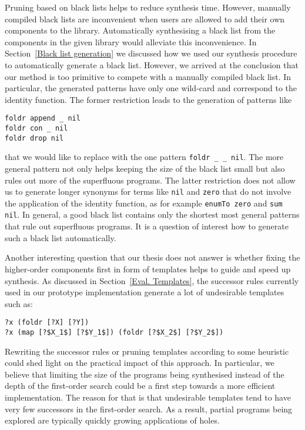Pruning based on black lists helps to reduce synthesis time. However, manually compiled black lists are inconvenient when users are allowed to add their own components to the library. Automatically synthesising a black list from the components in the given library would alleviate this inconvenience. In Section~\ref{Black list generation} we discussed how we used our synthesis procedure to automatically generate a black list. However, we arrived at the conclusion that our method is too primitive to compete with a manually compiled black list. In particular, the generated patterns have only one wild-card and correspond to the identity function. The former restriction leads to the generation of patterns like
\begin{lstlisting}[style=plain]
foldr append _ nil
foldr con _ nil
foldr drop nil
\end{lstlisting}
that we would like to replace with the one pattern \lstinline!foldr _ _ nil!. The more general pattern not only helps keeping the size of the black list small but also rules out more of the superfluous programs.
The latter restriction does not allow us to generate longer synonyms for terms like \lstinline!nil! and \lstinline!zero! that do not involve the application of the identity function, as for example \lstinline!enumTo zero! and \lstinline!sum nil!.
In general, a good black list contains only the shortest most general patterns that rule out superfluous programs. It is a question of interest how to generate such a black list automatically.

Another interesting question that our thesis does not answer is whether fixing the higher-order components first in form of templates helps to guide and speed up synthesis. As discussed in Section~\ref{Eval. Templates}, the successor rules currently used in our prototype implementation generate a lot of undesirable templates such as:
\begin{lstlisting}[style=plain]
?x (foldr [?X] [?Y])
?x (map [?$X_1$] [?$Y_1$]) (foldr [?$X_2$] [?$Y_2$])
\end{lstlisting}
Rewriting the successor rules or pruning templates according to some heuristic could shed light on the practical impact of this approach. In particular, we believe that limiting the size of the programs being synthesised instead of the depth of the first-order search could be a first step towards a more efficient implementation. The reason for that is that undesirable templates tend to have very few successors in the first-order search. As a result, partial programs being explored are typically quickly growing applications of holes.

